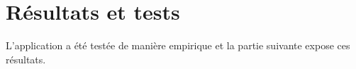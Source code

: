 \chapter{Résultats et tests}
L'application a été testée de manière empirique et la partie suivante expose ces résultats.